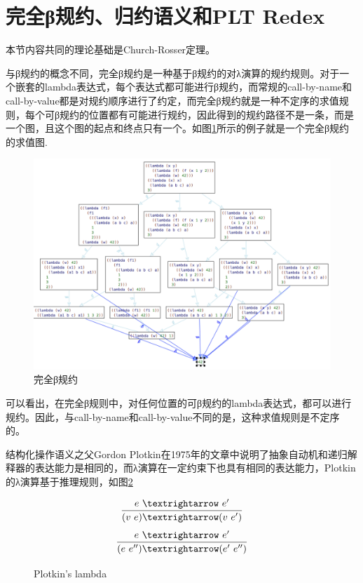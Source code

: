 \section{完全β规约、归约语义和PLT Redex}

本节内容共同的理论基础是Church-Rosser定理\cite{churchrosser}。

与β规约的概念不同，完全β规约是一种基于β规约的对λ演算的规约规则。对于一个嵌套的lambda表达式，每个表达式都可能进行β规约，而常规的call-by-name和call-by-value都是对规约顺序进行了约定，而完全β规约就是一种不定序的求值规则，每个可β规约的位置都有可能进行规约，因此得到的规约路径不是一条，而是一个图，且这个图的起点和终点只有一个。如图\ref{fig:beta}所示的例子就是一个完全β规约的求值图.

\begin{figure}[ht]
	\centering
	\includegraphics[width=12cm]{images/chapter2/fullbeta.png}
	\caption{完全β规约}
	\label{fig:beta}
\end{figure}

可以看出，在完全β规则中，对任何位置的可β规约的lambda表达式，都可以进行规约。因此，与call-by-name和call-by-value不同的是，这种求值规则是不定序的。

结构化操作语义\cite{structural}之父Gordon Plotkin在1975年的文章中说明了抽象自动机和递归解释器的表达能力是相同的，而λ演算在一定约束下也具有相同的表达能力，Plotkin的λ演算基于推理规则，如图\ref{fig:plotkin}

\begin{figure}[ht]
	\centering
	\[\infer {(v~e) → (v~e')}{e~→~e'}  \]
	\[\infer {(e~e'') → (e'~e'')} {e~→~e'}  \]
	\caption{Plotkin's lambda}
	\label{fig:plotkin}
\end{figure} 

	


